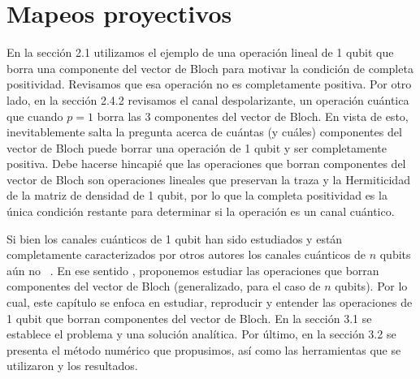 \chapter{Mapeos proyectivos}  
% 

En la sección 2.1  utilizamos el
ejemplo de una operación lineal 
de 1 qubit que borra una componente del vector de Bloch para motivar
la condición de completa positividad. 
Revisamos que esa operación no es completamente positiva.
Por otro lado, en la sección 2.4.2 revisamos el 
canal despolarizante, un operación cuántica que cuando $p=1$
borra las 3 componentes del vector de Bloch. En vista de esto, 
inevitablemente salta la pregunta acerca de cuántas (y cuáles) 
componentes del vector de Bloch puede borrar una operación 
de 1 qubit y ser completamente positiva.
Debe hacerse hincapié que las operaciones que borran componentes 
del vector de Bloch son operaciones lineales que 
preservan la traza y la Hermiticidad de la 
matriz de densidad de 1 qubit, por lo que la completa positividad 
es la única condición restante para determinar si la operación 
es un canal cuántico.

Si bien los canales cuánticos de 1 qubit han sido estudiados y 
están completamente caracterizados por otros autores
los canales cuánticos de $n$ qubits aún no~\cite{nielsen_chuang_2011}
\cite{bengtsson_zyczkowski_2017}. En
ese sentido , proponemos estudiar las
operaciones
que borran componentes del vector de Bloch (generalizado, para el 
caso de $n$ qubits). Por lo cual, este capítulo se enfoca en  
estudiar, reproducir y entender las operaciones de 1 qubit 
que borran componentes del vector de Bloch.  En la sección 3.1
se establece el problema y una solución analítica.
Por último, en la sección 3.2 se presenta el método numérico que 
propusimos, así como las herramientas que se utilizaron y 
los resultados.

